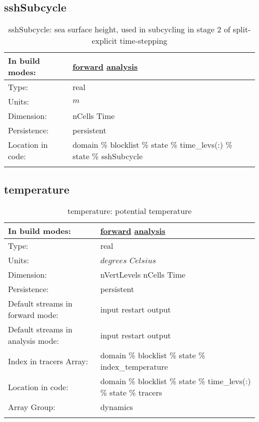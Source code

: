 \subsection[sshSubcycle]{sshSubcycle}
\label{subsec:var_sec_state_sshSubcycle}
\begin{center}
\begin{longtable}{| p{2.0in} | p{4.0in} |}
        \hline 
        In build modes: & \hyperref[subsec:forward_var_tab_state]{forward} \hyperref[subsec:analysis_var_tab_state]{analysis} \\
        \hline 
        Type: & real \\
        \hline 
        Units: & $m$ \\
        \hline 
        Dimension: & nCells Time \\
        \hline 
        Persistence: & persistent \\
        \hline 
		 Location in code: & domain \% blocklist \% state \% time\_levs(:) \% state \% sshSubcycle \\
		 \hline 
    \caption{sshSubcycle: sea surface height, used in subcycling in stage 2 of split-explicit time-stepping}
\end{longtable}
\end{center}
\subsection[temperature]{temperature}
\label{subsec:var_sec_state_temperature}
\begin{center}
\begin{longtable}{| p{2.0in} | p{4.0in} |}
        \hline 
        In build modes: & \hyperref[subsec:forward_var_tab_state]{forward} \hyperref[subsec:analysis_var_tab_state]{analysis} \\
        \hline 
        Type: & real \\
        \hline 
        Units: & $degrees$ $Celsius$ \\
        \hline 
        Dimension: & nVertLevels nCells Time \\
        \hline 
        Persistence: & persistent \\
        \hline 
		 Default streams in forward mode: &  input restart output \\
        \hline 
		 Default streams in analysis mode: &  input restart output \\
        \hline 
		 Index in tracers Array: & domain \% blocklist \% state \% index\_temperature \\
		 \hline 
		 Location in code: & domain \% blocklist \% state \% time\_levs(:) \% state \% tracers \\
		 \hline 
		 Array Group: & dynamics \\
		 \hline 
    \caption{temperature: potential temperature}
\end{longtable}
\end{center}
